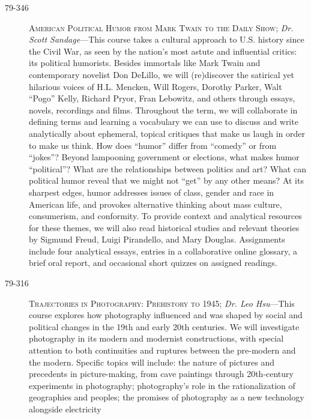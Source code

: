 \begin{description}
    \item [79-346] \textsc{American Political Humor from Mark Twain to the Daily
        Show}; \textit{Dr. Scott Sandage}---This course takes a cultural
        approach to U.S.  history since the Civil War, as seen by the nation's
        most astute and influential critics: its political humorists.  Besides
        immortals like Mark Twain and contemporary novelist Don DeLillo, we will
        (re)discover the satirical yet hilarious voices of H.L. Mencken, Will
        Rogers, Dorothy Parker, Walt ``Pogo'' Kelly, Richard Pryor, Fran
        Lebowitz, and others through essays, novels, recordings and films.
        Throughout the term, we will collaborate in defining terms and learning
        a vocabulary we can use to discuss and write analytically about
        ephemeral, topical critiques that make us laugh in order to make us
        think. How does ``humor'' differ from ``comedy'' or from ``jokes''?
        Beyond lampooning government or elections, what makes humor
        ``political''? What are the relationships between politics and art?
        What can political humor reveal that we might not ``get'' by any other
        means?  At its sharpest edges, humor addresses issues of class, gender
        and race in American life, and provokes alternative thinking about mass
        culture, consumerism, and conformity. To provide context and analytical
        resources for these themes, we will also read historical studies and
        relevant theories by Sigmund Freud, Luigi Pirandello, and Mary Douglas.
        Assignments include four analytical essays, entries in a collaborative
        online glossary, a brief oral report, and occasional short quizzes on
        assigned readings.
    \item [79-316] \textsc{Trajectories in Photography: Prehistory to 1945};
        \textit{Dr. Leo Hsu}---This course explores how photography influenced
        and was shaped by social and political changes in the 19th and early
        20th centuries. We will investigate photography in its modern and
        modernist constructions, with special attention to both continuities and
        ruptures between the pre-modern and the modern. Specific topics will
        include: the nature of pictures and precedents in picture-making, from
        cave paintings through 20th-century experiments in photography;
        photography's role in the rationalization of geographies and peoples;
        the promises of photography as a new technology alongside electricity

\end{description}
